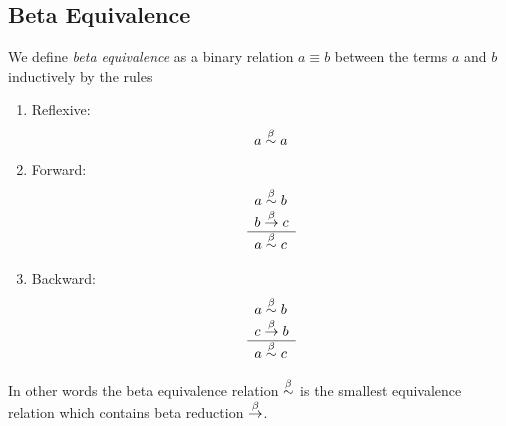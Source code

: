 \subsection{Beta Equivalence}


\begin{definition}
    We define \emph{beta equivalence} as a binary relation $a \equiv b$ between
    the terms $a$ and $b$ inductively by the rules
    \begin{enumerate}
    \item Reflexive:
        $$ a \stackrel{\beta}{\sim} a$$

    \item Forward:
        $$
        \begin{array}{l} 
            a \stackrel{\beta}{\sim} b
            \\
            b \stackrel{\beta}{\to} c
         \\ \hline 
            a \stackrel{\beta}{\sim} c
        \end{array}
        $$

    \item Backward:
        $$
        \begin{array}{l} 
            a \stackrel{\beta}{\sim} b
            \\
            c \stackrel{\beta}{\to} b
         \\ \hline 
            a \stackrel{\beta}{\sim} c
        \end{array}
        $$
    \end{enumerate}

    In other words the beta equivalence relation $\stackrel{\beta}{\sim}$ is the smallest
    equivalence relation which contains beta reduction $\stackrel{\beta}{\to}$.
\end{definition}


